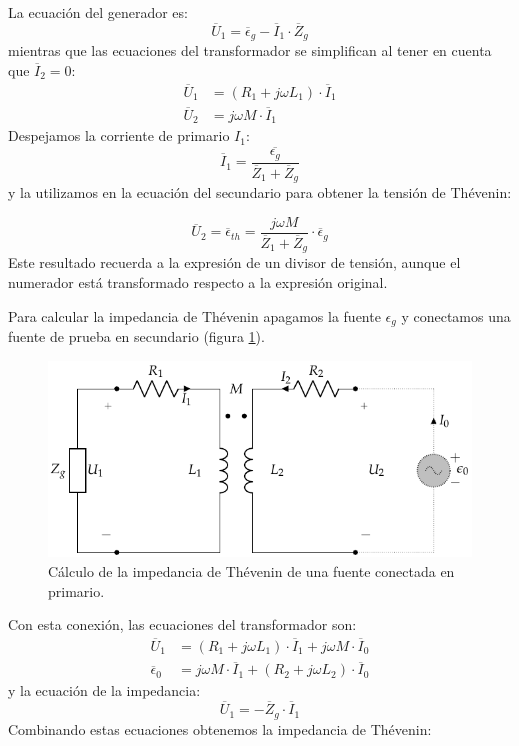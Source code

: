 La ecuación del generador es:
\[
  \overline{U}_1 = \overline{\epsilon}_g - \overline{I}_1 \cdot
  \overline{Z}_g
\]
mientras que las ecuaciones del transformador se simplifican al tener
en cuenta que $\overline{I}_2 = 0$:
\begin{align*}
  \overline{U}_1 &= (R_1 + j \omega L_1) \cdot \overline{I}_1\\
  \overline{U}_2 &= j \omega M \cdot \overline{I}_1
\end{align*}
Despejamos la corriente de primario $I_1$:
\[
  \overline{I}_1 = \frac{\overline{\epsilon_g}}{\overline{Z}_1 +
    \overline{Z}_g}
\]
y la utilizamos en la ecuación del secundario para obtener la tensión
de Thévenin:

\begin{equation}
  \label{eq:trafo-real-tension-thevenin}
  \overline{U}_2 = \boxed{\overline{\epsilon}_{th} = \frac{j\omega M}{\overline{Z}_1 + \overline{Z}_g} \cdot \overline{\epsilon}_g}
\end{equation}
Este resultado recuerda a la expresión de un divisor de tensión,
aunque el numerador está transformado respecto a la expresión
original.

Para calcular la impedancia de Thévenin apagamos la fuente
$\epsilon_g$ y conectamos una fuente de prueba en secundario (figura
\ref{fig:trafo-real-impedancia-thevenin}).
\begin{figure}
  \centering
  \includegraphics[height=.2\textheight]{../figs/Trafo_Real_ImpedanciaPrimario.pdf}
  \caption{Cálculo de la impedancia de Thévenin de una fuente
    conectada en primario.}
  \label{fig:trafo-real-impedancia-thevenin}
\end{figure}
Con esta conexión, las ecuaciones del transformador son:
\begin{align*}
  \overline{U}_1 &= (R_1 + j \omega L_1) \cdot \overline{I}_1 + j \omega M \cdot\overline{I}_0\\
  \overline{\epsilon}_0 &= j \omega M \cdot \overline{I}_1 + (R_2 + j \omega L_2) \cdot \overline{I}_0
\end{align*}
y la ecuación de la impedancia:
\[
  \overline{U}_1 = - \overline{Z}_g \cdot \overline{I}_1
\]
Combinando estas ecuaciones obtenemos la impedancia de Thévenin:

